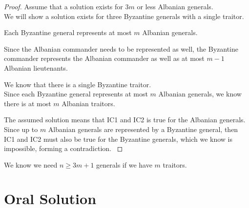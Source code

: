 \documentclass{beamer}
\theoremstyle{conjecture1}
\theoremstyle{conjecture2}
\begin{document}
\begin{frame}
    \begin{proof}
         {
            Assume that a solution exists for $3m$ or less Albanian generals. \\
            We will show a solution exists for three Byzantine generals with a single traitor. \\
        }
        

         {
            Each Byzantine general represents at most $m$ Albanian generals. 
        }

         {
            \vspace{12pt}
            Since the Albanian commander needs to be represented as well, the Byzantine commander represents 
            the Albanian commander as well as at most $m-1$ Albanian lieutenants. \\
        }

         {
            \vspace{12pt}
            We know that there is a single Byzantine traitor. \\
            Since each Byzantine general represents at most $m$ Albanian generals, we know there is at 
            most $m$ Albanian traitors. \\
        }

         {
            The assumed solution means that IC1 and IC2 is true for the Albanian generals. \\
            Since up to $m$ Albanian generals are represented by a Byzantine general, then IC1 and IC2 
            must also be true for the Byzantine generals, which we know is impossible, forming a contradiction.
        }
    \end{proof}
\end{frame}

\begin{frame}
    We know we need $n\geq3m+1$ generals if we have $m$ traitors.
\end{frame}



\section{Oral Solution}
\end{document}
